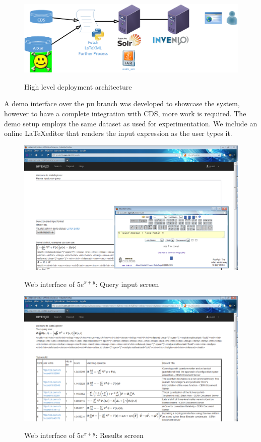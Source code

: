 \begin{figure}
\includegraphics[height=4.2 cm]{visio_drawings/architecture.png}
\label{system_arch}
\caption{High level deployment architecture}
\end{figure}


A demo interface over the {\codefont pu} branch was developed to showcase the system, however to have a complete integration with CDS, more work is required. The demo setup employs the same dataset as used for experimentation.
We include an online \LaTeX editor\cite{latex_editor} that renders the input expression as the user types it. 

\begin{figure}
\includegraphics[height=8 cm]{figures/input_interface.png}
\label{input_int}
\caption{Web interface of $5e^{x+y}$: Query input screen}
\end{figure}

\begin{figure}
\includegraphics[height=8 cm]{figures/results_interface.png}
\label{results_int}
\caption{Web interface of $5e^{x+y}$: Results screen}
\end{figure}
	
 
